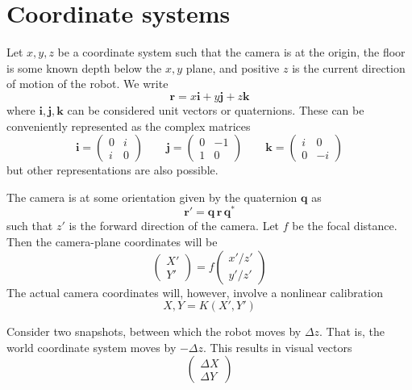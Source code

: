 \documentclass{article}
\def\r{\mathbf{r}}
\def\q{\mathbf{q}}
\def\i{\mathbf{i}}
\def\j{\mathbf{j}}
\def\k{\mathbf{k}}
\begin{document}
\section{Coordinate systems}

Let $x,y,z$ be a coordinate system such that the camera is at the
origin, the floor is some known depth below the $x,y$ plane, and
positive $z$ is the current direction of motion of the robot. We write
\begin{equation}
  \r = x\i + y\j + z\k
\end{equation}
where $\i,\j,\k$ can be considered unit vectors or quaternions.  These
can be conveniently represented as the complex matrices
\begin{equation}
\i = \begin{pmatrix} 0 & i  \\ i & 0  \end{pmatrix} \qquad
\j = \begin{pmatrix} 0 & -1 \\ 1 & 0  \end{pmatrix} \qquad
\k = \begin{pmatrix} i & 0  \\ 0 & -i \end{pmatrix}
\end{equation}
but other representations are also possible.

The camera is at some orientation given by the quaternion $\q$ as
\begin{equation}
\r' = \q \, \r \, \q^*
\end{equation}
such that $z'$ is the forward direction of the camera.  Let $f$ be the
focal distance.  Then the camera-plane coordinates will be
\begin{equation}
  \begin{pmatrix} X' \\ Y' \end{pmatrix} =
  f \begin{pmatrix} x'/z' \\ y'/z' \end{pmatrix}
\end{equation}
The actual camera coordinates will, however, involve a nonlinear
calibration
\begin{equation}
  X,Y = K(X',Y')
\end{equation}

Consider two snapshots, between which the robot moves by $\Delta z$.
That is, the world coordinate system moves by $-\Delta z$.  This
results in visual vectors
\begin{equation}
  \begin{pmatrix} \Delta X \\ \Delta Y \end{pmatrix}
\end{equation}
\end{document}
